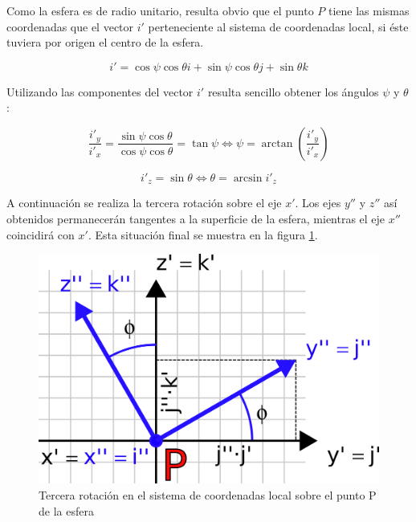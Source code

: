 \documentclass[12pt, a4paper]{report}
\begin{document}
Como la esfera es de radio unitario, resulta obvio que el punto $P$ tiene las mismas coordenadas que el vector $i'$ perteneciente al sistema de coordenadas local, si éste tuviera por origen el centro de la esfera.

\begin{equation} \label{eq: E13}
i' = \cos \psi \cos \theta i + \sin \psi \cos \theta j + \sin \theta k
\end{equation}

Utilizando las componentes del vector $i'$ resulta sencillo obtener los ángulos $\psi$ y $\theta$:

\begin{equation}
\frac{i'_y}{i'_x} =  \frac{\sin \psi \cos \theta}{\cos \psi \cos \theta} = \tan{\psi} \iff \psi = \arctan \left( \frac{i'_y}{i'_x} \right)
\end{equation}

\begin{equation}
i'_z =  \sin \theta \iff \theta = \arcsin i'_z
\end{equation}

A continuación se realiza la tercera rotación sobre el eje $x'$. Los ejes $y''$ y $z''$ así obtenidos permanecerán tangentes a la superficie de la esfera, mientras el eje $x''$ coincidirá con $x'$. Esta situación final se muestra en la figura \ref{fig: esfera_local}.\\

\begin{figure}[h]
	\centering
		\includegraphics[scale=2]{../img/sphere_local.png} 
	\caption{Tercera rotación en el sistema de coordenadas local sobre el punto P de la esfera}
	\label{fig: esfera_local}
\end{figure}
\end{document}
